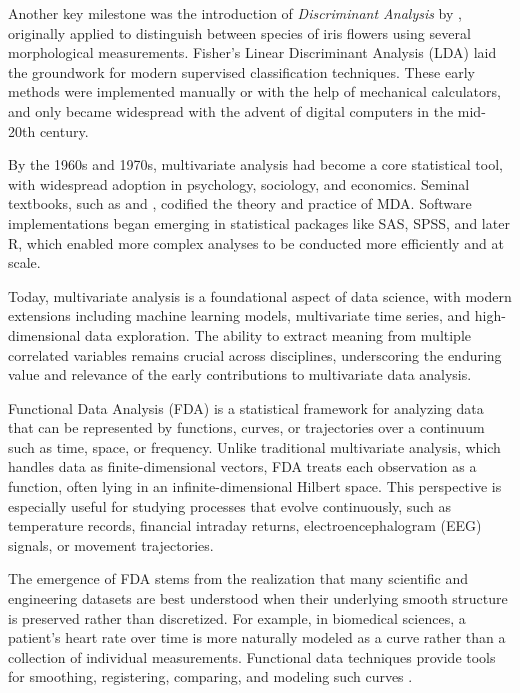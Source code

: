 \documentclass[
	12pt,				%
	oneside,			%
	a4paper,			%
	english,			%
	brazil				%
	]{abntex2ppgsi}
\begin{document}
Another key milestone was the introduction of \textit{Discriminant Analysis} by , originally applied to distinguish between species of iris flowers using several morphological measurements. Fisher’s Linear Discriminant Analysis (LDA) laid the groundwork for modern supervised classification techniques. These early methods were implemented manually or with the help of mechanical calculators, and only became widespread with the advent of digital computers in the mid-20th century.

By the 1960s and 1970s, multivariate analysis had become a core statistical tool, with widespread adoption in psychology, sociology, and economics. Seminal textbooks, such as  and , codified the theory and practice of MDA. Software implementations began emerging in statistical packages like SAS, SPSS, and later R, which enabled more complex analyses to be conducted more efficiently and at scale.

Today, multivariate analysis is a foundational aspect of data science, with modern extensions including machine learning models, multivariate time series, and high-dimensional data exploration. The ability to extract meaning from multiple correlated variables remains crucial across disciplines, underscoring the enduring value and relevance of the early contributions to multivariate data analysis.

Functional Data Analysis (FDA) is a statistical framework for analyzing data that can be represented by functions, curves, or trajectories over a continuum such as time, space, or frequency. Unlike traditional multivariate analysis, which handles data as finite-dimensional vectors, FDA treats each observation as a function, often lying in an infinite-dimensional Hilbert space. This perspective is especially useful for studying processes that evolve continuously, such as temperature records, financial intraday returns, electroencephalogram (EEG) signals, or movement trajectories.

The emergence of FDA stems from the realization that many scientific and engineering datasets are best understood when their underlying smooth structure is preserved rather than discretized. For example, in biomedical sciences, a patient’s heart rate over time is more naturally modeled as a curve rather than a collection of individual measurements. Functional data techniques provide tools for smoothing, registering, comparing, and modeling such curves .
\end{document}
